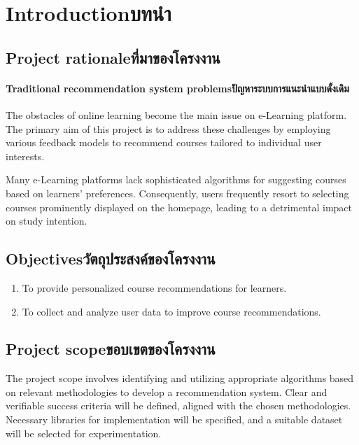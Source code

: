 \chapter{\ifenglish Introduction\else บทนำ\fi}
\section{\ifenglish Project rationale\else ที่มาของโครงงาน\fi}

\subsubsection{\ifenglish Traditional recommendation system problems\else ปัญหาระบบการแนะนำแบบดั้งเดิม\fi}

The obstacles of online learning become the main issue on e-Learning platform. 
The primary aim of this project is to address these challenges by employing 
various feedback models to recommend courses tailored to individual user interests.

Many e-Learning platforms lack sophisticated algorithms for suggesting courses based on learners' 
preferences. Consequently, users frequently resort to selecting courses prominently displayed on 
the homepage, leading to a detrimental impact on study intention.

\section{\ifenglish Objectives\else วัตถุประสงค์ของโครงงาน\fi}
\begin{enumerate}
    \item To provide personalized course recommendations for learners.
    \item To collect and analyze user data to improve course recommendations.
\end{enumerate}

\section{\ifenglish Project scope\else ขอบเขตของโครงงาน\fi}

The project scope involves identifying and utilizing appropriate algorithms based on relevant 
methodologies to develop a recommendation system. Clear and verifiable success criteria will 
be defined, aligned with the chosen methodologies. Necessary libraries for implementation will 
be specified, and a suitable dataset will be selected for experimentation.

